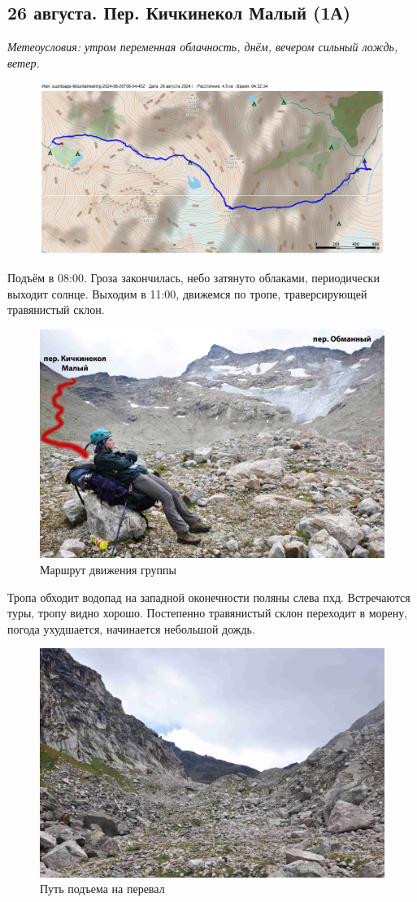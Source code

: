 \subsection{26 августа. Пер. Кичкинекол Малый (1А)}
\textit{Метеоусловия: утром переменная облачность, днём, вечером сильный лождь, ветер.}


\begin{figure}[h!]
	\centering
	\includegraphics[angle=0, width=0.7\linewidth]{../pics/mini_maps/26}
	\label{fig:mini_26}
\end{figure}

Подъём в 08:00. Гроза закончилась, небо затянуто облаками, периодически выходит солнце. Выходим в 11:00, движемся по тропе, траверсирующей травянистый склон.

\begin{figure}[h!]
	\centering
	\includegraphics[width=0.7\linewidth]{../pics/DSC_0226}
	\caption{Маршрут движения группы}
	\label{fig:DSC_0226}
\end{figure}

 Тропа обходит водопад на западной оконечности поляны слева пхд. Встречаются туры, тропу видно хорошо. Постепенно травянистый склон переходит в морену, погода ухудшается, начинается небольшой дождь.

\begin{figure}[h!]
	\centering
	\includegraphics[width=0.7\linewidth]{../pics/DSC_0221.JPG}
	\caption{Путь подъема на перевал}
	\label{fig:DSC_0221}
\end{figure}

